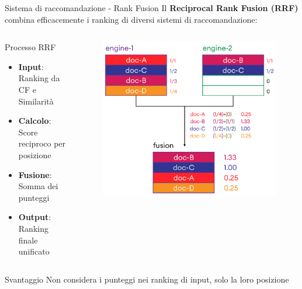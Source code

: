 \documentclass{beamer}
\begin{document}
	\begin{frame}{Sistema di raccomandazione - Rank Fusion}
		Il \textbf{Reciprocal Rank Fusion (RRF)} combina efficacemente i ranking di diversi sistemi di raccomandazione:

		\begin{columns}
			\begin{column}{0.6\textwidth}
				\begin{block}{Processo RRF}
					\begin{itemize}
						\item \textbf{Input}: Ranking da CF e Similarità
						\item \textbf{Calcolo}: Score reciproco per posizione
						\item \textbf{Fusione}: Somma dei punteggi
						\item \textbf{Output}: Ranking finale unificato
					\end{itemize}
				\end{block}
			\end{column}
			\begin{column}{0.4\textwidth}
				\begin{figure}
					\centering
					\includegraphics[width=\textwidth]{Reciprocal-Rank-Fusion.png}
				\end{figure}
			\end{column}
		\end{columns}

		\begin{alertblock}{Svantaggio}
			Non considera i punteggi nei ranking di input, solo la loro posizione
		\end{alertblock}
	\end{frame}
\end{document}
